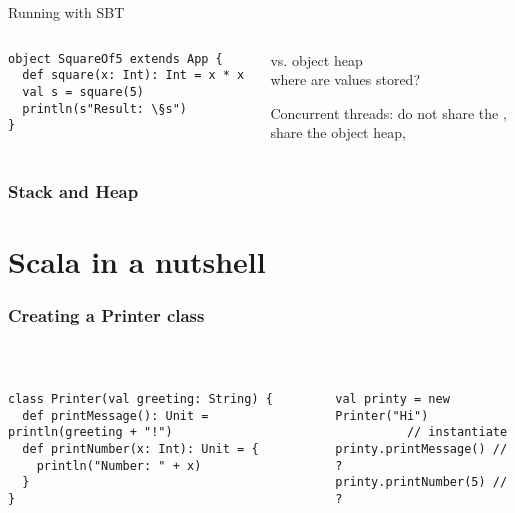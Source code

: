 \documentclass[aspectratio=169]{beamer}
\begin{document}
\begin{frame}[fragile]{Running with SBT}
~\\[-8mm]
\begin{columns}
\begin{column}{0.48\textwidth}
\begin{lstlisting}
object SquareOf5 extends App {
  def square(x: Int): Int = x * x
  val s = square(5)
  println(s"Result: \§s")
}
\end{lstlisting}
\end{column}
\begin{column}{0.48\textwidth}
 vs. \alert{object heap}
\\[2mm]
where are values stored?
\\[5mm]
\begin{block}{Concurrent threads:}
do not share the ,
\\share the \alert{object heap},  
\end{block}
\end{column}
\end{columns}
\end{frame}


\begin{frame}\frametitle{Stack and Heap}
    \centering
    

\end{frame}

\section{Scala in a nutshell}

\begin{frame}[fragile]\frametitle{Creating a Printer class}
~\\[-8mm]
\begin{columns}
\begin{column}{0.52\textwidth}
\begin{lstlisting}
class Printer(val greeting: String) {
  def printMessage(): Unit = println(greeting + "!")
  def printNumber(x: Int): Unit = {
    println("Number: " + x)
  }
}
\end{lstlisting}
\end{column}
\begin{column}{0.44\textwidth}
%
\pause
\begin{lstlisting}
val printy = new Printer("Hi")
          // instantiate
printy.printMessage() // ?
printy.printNumber(5) // ?
\end{lstlisting}
\end{column}
\end{columns}
\end{frame}
\end{document}
